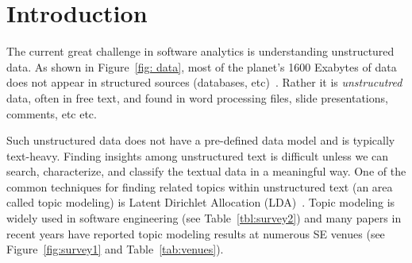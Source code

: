 \documentclass[10pt,conference]{IEEEtran}
\theoremstyle{break}
\begin{document}

\section{Introduction}
\label{sect: intro}
The current great challenge in software analytics is understanding unstructured data. As shown in Figure~\ref{fig: data}, most of the planet's 1600 Exabytes of data does not appear in structured sources (databases, etc)~\cite{nadkarni2014structured}. Rather
it is {\em unstrucutred} data, often in free text, and found in word processing
files, slide presentations, comments, etc etc. 

Such unstructured data does not have a pre-defined data model and is typically text-heavy. Finding insights among unstructured text is  difficult unless we can search, characterize, and classify the textual data in a meaningful way. One of the common techniques for finding related topics within unstructured text (an area called topic modeling) is Latent Dirichlet Allocation (LDA)~\cite{blei2003latent}.
Topic modeling is widely used in software engineering (see Table~\ref{tbl:survey2})
and many papers in recent years have reported  topic modeling results at numerous SE venues (see Figure~\ref{fig:survey1} and Table~\ref{tab:venues}).




\end{document}
